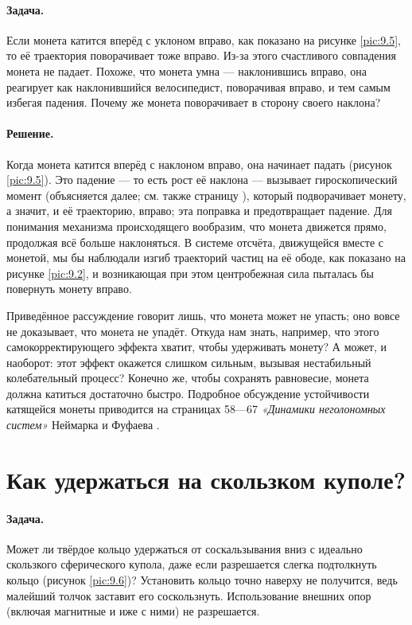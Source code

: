 \paragraph{Задача.}
Если монета катится вперёд с уклоном вправо, как показано на рисунке \ref{pic:9.5}, то её траектория поворачивает тоже вправо.
Из-за этого счастливого совпадения монета не падает.
Похоже, что монета умна --- наклонившись вправо, она реагирует как наклонившийся велосипедист, поворачивая вправо, и тем самым избегая падения.
Почему же монета поворачивает в сторону своего наклона?

\paragraph{Решение.}
Когда монета катится вперёд с наклоном вправо,
она начинает падать (рисунок \ref{pic:9.5}).
Это падение --- то есть рост её наклона ---
вызывает гироскопический момент (объясняется далее;
см. также страницу \pageref{Антигравитационное велоколесо:Ответ}),
который подворачивает монету, а значит, и её траекторию, вправо; эта поправка и предотвращает падение.
Для понимания механизма происходящего вообразим, что монета движется прямо, продолжая всё больше наклоняться.
В системе отсчёта, движущейся вместе с монетой, мы бы наблюдали изгиб траекторий частиц на её ободе, как показано
на рисунке \ref{pic:9.2}, и возникающая при этом центробежная сила пыталась бы повернуть монету вправо.

Приведённое рассуждение говорит лишь, что монета может не упасть; оно вовсе не доказывает, что монета не упадёт.
Откуда нам знать, например, что этого самокорректирующего эффекта хватит, чтобы удерживать монету?
А может, и наоборот: этот эффект окажется слишком сильным, вызывая нестабильный колебательный процесс?
Конечно же, чтобы сохранять равновесие, монета должна катиться достаточно быстро.
Подробное обсуждение устойчивости катящейся монеты приводится на страницах 58---67 \emph{«Динамики неголономных систем»} Неймарка и Фуфаева \cite{neimark1972}.

\section{Как удержаться на скользком куполе?}\label{Как удержаться на скользком куполе?}

\paragraph{Задача.}
Может ли твёрдое кольцо удержаться от соскальзывания вниз с идеально скользкого сферического купола, даже если разрешается слегка подтолкнуть кольцо (рисунок \ref{pic:9.6})?
Установить кольцо точно наверху не получится, ведь малейший толчок заставит его соскользнуть.
Использование внешних опор (включая магнитные и иже с ними) не разрешается.

